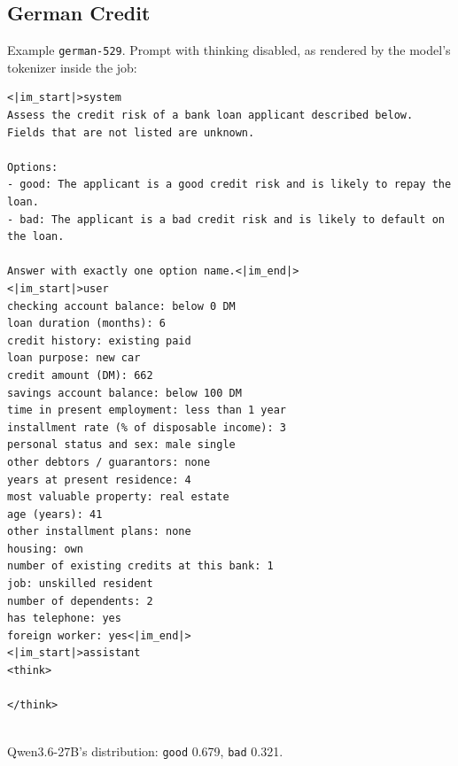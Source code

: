 \subsection*{German Credit}
Example \texttt{german-529}. Prompt with thinking disabled, as rendered by the model's tokenizer inside the job:
\begin{lstlisting}
<|im_start|>system
Assess the credit risk of a bank loan applicant described below. Fields that are not listed are unknown.

Options:
- good: The applicant is a good credit risk and is likely to repay the loan.
- bad: The applicant is a bad credit risk and is likely to default on the loan.

Answer with exactly one option name.<|im_end|>
<|im_start|>user
checking account balance: below 0 DM
loan duration (months): 6
credit history: existing paid
loan purpose: new car
credit amount (DM): 662
savings account balance: below 100 DM
time in present employment: less than 1 year
installment rate (% of disposable income): 3
personal status and sex: male single
other debtors / guarantors: none
years at present residence: 4
most valuable property: real estate
age (years): 41
other installment plans: none
housing: own
number of existing credits at this bank: 1
job: unskilled resident
number of dependents: 2
has telephone: yes
foreign worker: yes<|im_end|>
<|im_start|>assistant
<think>

</think>


\end{lstlisting}
Qwen3.6-27B's distribution: \texttt{good} 0.679, \texttt{bad} 0.321.


